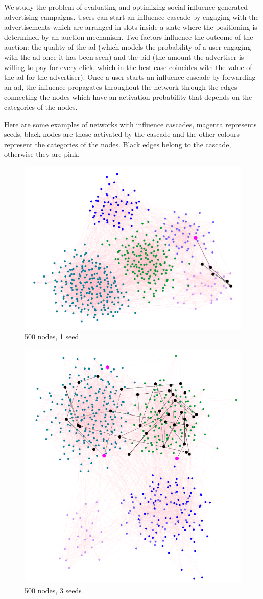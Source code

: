 \documentclass{article}
\begin{document}
We study the problem of evaluating and optimizing social influence generated advertising campaigns. Users can start an influence cascade by engaging with the advertisements which are arranged in slots inside a slate where the positioning is determined by an auction mechanism. Two factors influence the outcome of the auction: the quality of the ad (which models the probability of a user engaging with the ad once it has been seen) and the bid (the amount the advertiser is willing to pay for every click, which in the best case coincides with the value of the ad for the advertiser). Once a user starts an influence cascade by forwarding an ad, the influence propagates throughout the network through the edges connecting the nodes which have an activation probability that depends on the categories of the nodes.


Here are some examples of networks with influence cascades, magenta represents seeds, black nodes are those activated by the cascade and the other colours represent the categories of the nodes. Black edges belong to the cascade, otherwise they are pink.
\begin{figure}[H]
\centering
\includegraphics[width=0.80\linewidth]{images/network-1seed.png}
\caption{500 nodes, 1 seed}
\end{figure}
\begin{figure}[H]
\centering
\includegraphics[width=0.80\linewidth]{images/netowrk-3seed.png}
\caption{500 nodes, 3 seeds}
\end{figure}
\end{document}
